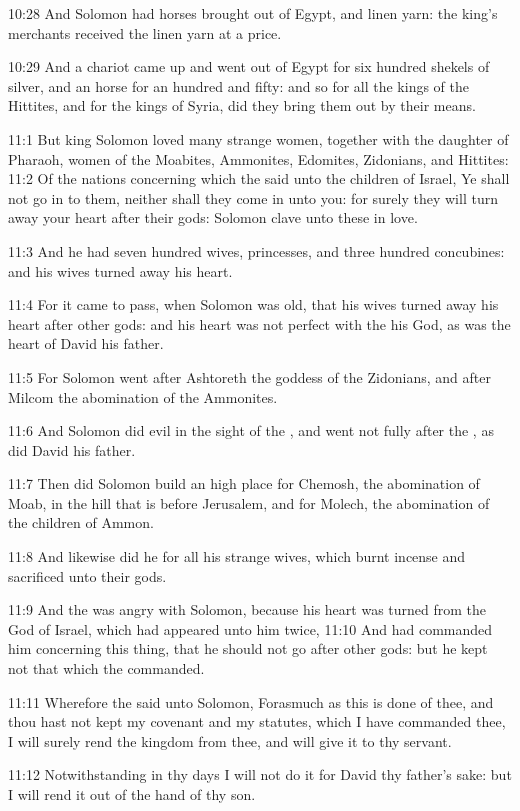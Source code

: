 10:28 And Solomon had horses brought out of Egypt, and linen yarn: the
king's merchants received the linen yarn at a price.

10:29 And a chariot came up and went out of Egypt for six hundred
shekels of silver, and an horse for an hundred and fifty: and so for
all the kings of the Hittites, and for the kings of Syria, did they
bring them out by their means.

11:1 But king Solomon loved many strange women, together with the
daughter of Pharaoh, women of the Moabites, Ammonites, Edomites,
Zidonians, and Hittites: 11:2 Of the nations concerning which the \LORD
said unto the children of Israel, Ye shall not go in to them, neither
shall they come in unto you: for surely they will turn away your heart
after their gods: Solomon clave unto these in love.

11:3 And he had seven hundred wives, princesses, and three hundred
concubines: and his wives turned away his heart.

11:4 For it came to pass, when Solomon was old, that his wives turned
away his heart after other gods: and his heart was not perfect with
the \LORD his God, as was the heart of David his father.

11:5 For Solomon went after Ashtoreth the goddess of the Zidonians,
and after Milcom the abomination of the Ammonites.

11:6 And Solomon did evil in the sight of the \LORD, and went not fully
after the \LORD, as did David his father.

11:7 Then did Solomon build an high place for Chemosh, the abomination
of Moab, in the hill that is before Jerusalem, and for Molech, the
abomination of the children of Ammon.

11:8 And likewise did he for all his strange wives, which burnt
incense and sacrificed unto their gods.

11:9 And the \LORD was angry with Solomon, because his heart was turned
from the \LORD God of Israel, which had appeared unto him twice, 11:10
And had commanded him concerning this thing, that he should not go
after other gods: but he kept not that which the \LORD commanded.

11:11 Wherefore the \LORD said unto Solomon, Forasmuch as this is done
of thee, and thou hast not kept my covenant and my statutes, which I
have commanded thee, I will surely rend the kingdom from thee, and
will give it to thy servant.

11:12 Notwithstanding in thy days I will not do it for David thy
father's sake: but I will rend it out of the hand of thy son.

